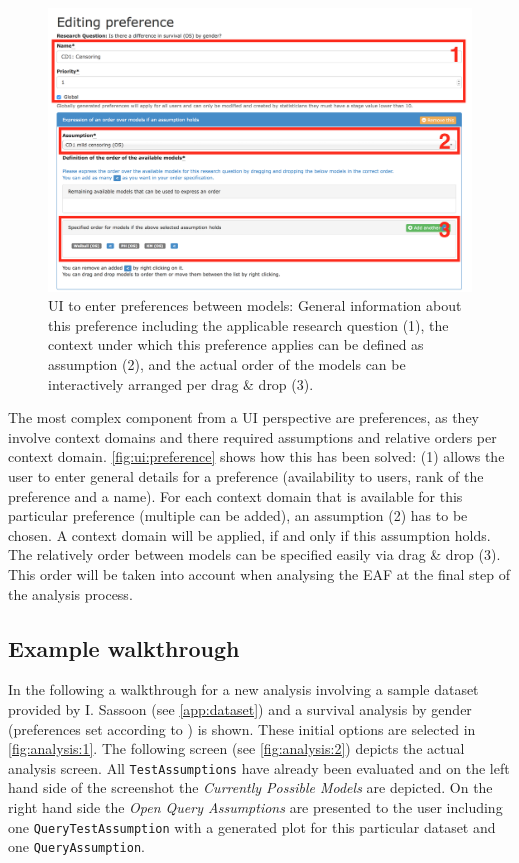 \begin{figure}[!hbt]
	\centering
	\includegraphics[width=\textwidth]{figures/ui_preference}
	\caption{\gls{UI} to enter preferences between models: General information about this preference including the applicable research question (1), the context under which this preference applies can be defined as assumption (2), and the actual order of the models can be interactively arranged per drag \& drop (3).}
	\label{fig:ui:preference}
\end{figure}


The most complex component from a \gls{UI} perspective are preferences, as they involve context domains and there required assumptions and relative orders per context domain. \autoref{fig:ui:preference} shows how this has been solved: (1) allows the user to enter general details for a preference (availability to users, rank of the preference and a name). For each context domain that is available for this particular preference (multiple can be added), an assumption (2) has to be chosen. A context domain will be applied, if and only if this assumption holds. The relatively order between models can be specified easily via drag \& drop (3). This order will be taken into account when analysing the \gls{EAF} at the final step of the analysis process. 



\subsection{Example walkthrough}
\label{sub:walk}

In the following a walkthrough for a new analysis involving a sample dataset provided by I. Sassoon (see \autoref{app:dataset}) and a survival analysis by gender (preferences set according to \cite{sassoon2016CD}) is shown. These initial options are selected in \autoref{fig:analysis:1}. The following screen (see \autoref{fig:analysis:2}) depicts the actual analysis screen. All \texttt{TestAssumptions} have already been evaluated and on the left hand side of the screenshot the \textit{Currently Possible Models} are depicted. On the right hand side the \textit{Open Query Assumptions} are presented to the user including one \texttt{QueryTestAssumption} with a generated plot for this particular dataset and one \texttt{QueryAssumption}. 

